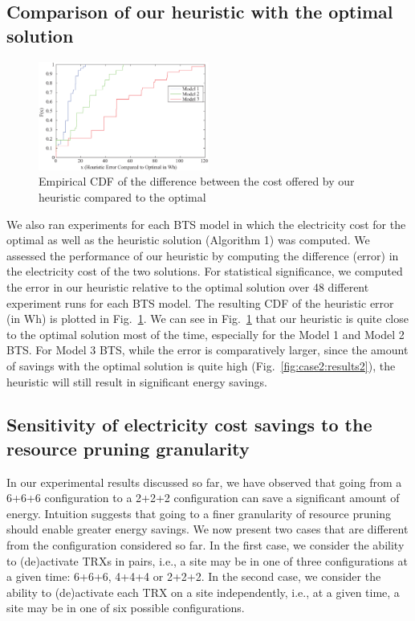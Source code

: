 \subsection{Comparison of our heuristic with the optimal solution}
\label{subsec:case2:results:heuristic1}

\begin{figure}
\centering
\includegraphics[width=0.5\textwidth]{pics/heuristicerror-touchedup.eps}
\caption{Empirical CDF of the difference between the cost offered by our heuristic compared to the optimal}
\label{fig:results5}
\end{figure}

We also ran experiments for each BTS model in which the electricity cost for the optimal as well as the heuristic solution (Algorithm 1) was computed. We assessed the performance of our heuristic by computing the difference (error) in the electricity cost of the two solutions. For statistical significance, we computed the error in our heuristic relative to the optimal solution over 48 different experiment runs for each BTS model. The resulting CDF of the heuristic error (in Wh) is plotted in Fig.~\ref{fig:results5}. We can see in Fig.~\ref{fig:results5} that our heuristic is quite close to the optimal solution most of the time, especially for the Model 1 and Model 2 BTS. For Model 3 BTS, while the error is comparatively larger, since the amount of savings with the optimal solution is quite high (Fig.~\ref{fig:case2:results2}), the heuristic will still result in significant energy savings.  

\subsection{Sensitivity of electricity cost savings to the resource pruning granularity} %
\label{subsec:case2:results:granularity} In our experimental results discussed so far, we have observed that going from a 6+6+6 configuration to a 2+2+2 configuration can save a significant amount of energy. Intuition suggests that going to a finer granularity of resource pruning should enable greater energy savings. We now present two cases that are different from the configuration considered so far. In the first case, we consider the ability to (de)activate TRXs in pairs, i.e., a site may be in one of three configurations at a given time: 6+6+6, 4+4+4 or 2+2+2. In the second case, we consider the ability to (de)activate each TRX on a site independently, i.e., at a given time, a site may be in one of six possible configurations. 

